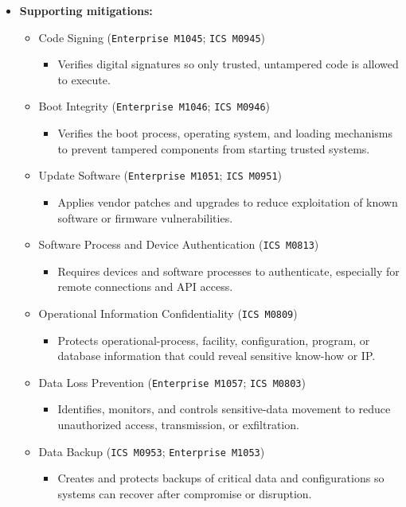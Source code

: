 \documentclass[10pt,a4paper,oneside]{report}
\begin{document}
\begin{itemize}
\item \textbf{Supporting mitigations:}
\begin{itemize}
\item Code Signing (\texttt{Enterprise M1045}; \texttt{ICS M0945})
\begin{itemize}
\item Verifies digital signatures so only trusted, untampered code is allowed to execute.
\end{itemize}
\item Boot Integrity (\texttt{Enterprise M1046}; \texttt{ICS M0946})
\begin{itemize}
\item Verifies the boot process, operating system, and loading mechanisms to prevent tampered components from starting trusted systems.
\end{itemize}
\item Update Software (\texttt{Enterprise M1051}; \texttt{ICS M0951})
\begin{itemize}
\item Applies vendor patches and upgrades to reduce exploitation of known software or firmware vulnerabilities.
\end{itemize}
\item Software Process and Device Authentication (\texttt{ICS M0813})
\begin{itemize}
\item Requires devices and software processes to authenticate, especially for remote connections and API access.
\end{itemize}
\item Operational Information Confidentiality (\texttt{ICS M0809})
\begin{itemize}
\item Protects operational-process, facility, configuration, program, or database information that could reveal sensitive know-how or IP.
\end{itemize}
\item Data Loss Prevention (\texttt{Enterprise M1057}; \texttt{ICS M0803})
\begin{itemize}
\item Identifies, monitors, and controls sensitive-data movement to reduce unauthorized access, transmission, or exfiltration.
\end{itemize}
\item Data Backup (\texttt{ICS M0953}; \texttt{Enterprise M1053})
\begin{itemize}
\item Creates and protects backups of critical data and configurations so systems can recover after compromise or disruption.
\end{itemize}
\end{itemize}
\end{itemize}
\end{document}
